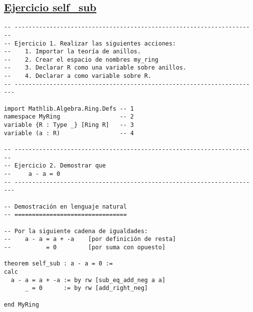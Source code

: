 \subsection{\href{./src/Basicos/self\_sub.lean}{Ejercicio self\_sub}}
\label{sec:org962e50c}
\begin{verbatim}
-- ---------------------------------------------------------------------
-- Ejercicio 1. Realizar las siguientes acciones:
--    1. Importar la teoría de anillos.
--    2. Crear el espacio de nombres my_ring
--    3. Declarar R como una variable sobre anillos.
--    4. Declarar a como variable sobre R.
-- ----------------------------------------------------------------------

import Mathlib.Algebra.Ring.Defs -- 1
namespace MyRing                 -- 2
variable {R : Type _} [Ring R]   -- 3
variable (a : R)                 -- 4

-- ---------------------------------------------------------------------
-- Ejercicio 2. Demostrar que
--     a - a = 0
-- ----------------------------------------------------------------------

-- Demostración en lenguaje natural
-- ================================

-- Por la siguiente cadena de igualdades:
--    a - a = a + -a    [por definición de resta]
--          = 0         [por suma con opuesto]

theorem self_sub : a - a = 0 :=
calc
  a - a = a + -a := by rw [sub_eq_add_neg a a]
      _ = 0      := by rw [add_right_neg]

end MyRing
\end{verbatim}

